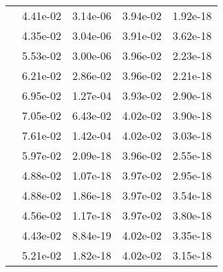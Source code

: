 \begin{table}
\begin{tabular}{c|cc|cc|}
\multicolumn{1}{|c|}{} & \multicolumn{1}{|c|}{  4.41e-02} & \multicolumn{1}{|c|}{  3.14e-06} & \multicolumn{1}{|c|}{  3.94e-02} & \multicolumn{1}{|c|}{  1.92e-18} \\ 
\multicolumn{1}{|c|}{} & \multicolumn{1}{|c|}{  4.35e-02} & \multicolumn{1}{|c|}{  3.04e-06} & \multicolumn{1}{|c|}{  3.91e-02} & \multicolumn{1}{|c|}{  3.62e-18} \\ 
\multicolumn{1}{|c|}{} & \multicolumn{1}{|c|}{  5.53e-02} & \multicolumn{1}{|c|}{  3.00e-06} & \multicolumn{1}{|c|}{  3.96e-02} & \multicolumn{1}{|c|}{  2.23e-18} \\ 
\multicolumn{1}{|c|}{} & \multicolumn{1}{|c|}{  6.21e-02} & \multicolumn{1}{|c|}{  2.86e-02} & \multicolumn{1}{|c|}{  3.96e-02} & \multicolumn{1}{|c|}{  2.21e-18} \\ 
\multicolumn{1}{|c|}{} & \multicolumn{1}{|c|}{  6.95e-02} & \multicolumn{1}{|c|}{  1.27e-04} & \multicolumn{1}{|c|}{  3.93e-02} & \multicolumn{1}{|c|}{  2.90e-18} \\ 
\multicolumn{1}{|c|}{} & \multicolumn{1}{|c|}{  7.05e-02} & \multicolumn{1}{|c|}{  6.43e-02} & \multicolumn{1}{|c|}{  4.02e-02} & \multicolumn{1}{|c|}{  3.90e-18} \\ 
\multicolumn{1}{|c|}{} & \multicolumn{1}{|c|}{  7.61e-02} & \multicolumn{1}{|c|}{  1.42e-04} & \multicolumn{1}{|c|}{  4.02e-02} & \multicolumn{1}{|c|}{  3.03e-18} \\ 
\multicolumn{1}{|c|}{} & \multicolumn{1}{|c|}{  5.97e-02} & \multicolumn{1}{|c|}{  2.09e-18} & \multicolumn{1}{|c|}{  3.96e-02} & \multicolumn{1}{|c|}{  2.55e-18} \\ 
\multicolumn{1}{|c|}{} & \multicolumn{1}{|c|}{  4.88e-02} & \multicolumn{1}{|c|}{  1.07e-18} & \multicolumn{1}{|c|}{  3.97e-02} & \multicolumn{1}{|c|}{  2.95e-18} \\ 
\multicolumn{1}{|c|}{} & \multicolumn{1}{|c|}{  4.88e-02} & \multicolumn{1}{|c|}{  1.86e-18} & \multicolumn{1}{|c|}{  3.97e-02} & \multicolumn{1}{|c|}{  3.54e-18} \\ 
\multicolumn{1}{|c|}{} & \multicolumn{1}{|c|}{  4.56e-02} & \multicolumn{1}{|c|}{  1.17e-18} & \multicolumn{1}{|c|}{  3.97e-02} & \multicolumn{1}{|c|}{  3.80e-18} \\ 
\multicolumn{1}{|c|}{} & \multicolumn{1}{|c|}{  4.43e-02} & \multicolumn{1}{|c|}{  8.84e-19} & \multicolumn{1}{|c|}{  4.02e-02} & \multicolumn{1}{|c|}{  3.35e-18} \\ 
\multicolumn{1}{|c|}{} & \multicolumn{1}{|c|}{  5.21e-02} & \multicolumn{1}{|c|}{  1.82e-18} & \multicolumn{1}{|c|}{  4.02e-02} & \multicolumn{1}{|c|}{  3.15e-18} \\ 

\end{tabular}
\end{table}
